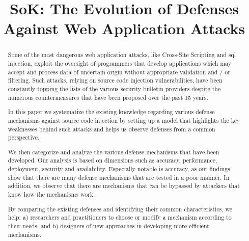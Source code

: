 \documentclass[conference]{IEEEtran}
\date{}
\begin{document}
\author{
}

\title{SoK: The Evolution of Defenses Against Web Application Attacks}

\maketitle
\begin{abstract}

  Some of the most dangerous web application attacks, like Cross-Site
  Scripting and {\sc sql} injection, exploit the oversight of
  programmers that develop applications which may accept and process
  data of uncertain origin without appropriate validation and / or
  filtering. Such attacks, relying on source code injection
  vulnerabilities, have been constantly topping the lists of the
  various security bulletin providers despite the numerous
  countermeasures that have been proposed over the past 15 years.

  In this paper we systematize the existing knowledge regarding
  various defense mechanisms against source code injection by setting
  up a model that highlights the key weaknesses behind such attacks and
  helps us observe defenses from a common perspective.

  We then categorize and analyze the various defense mechanisms that
  have been developed. Our analysis is based on dimensions such as
  accuracy, performance, deployment, security and availability.
  Especially notable is accuracy, as our findings show that there are
  many defense mechanisms that are tested in a poor manner.
  In addition, we observe that there are mechanisms
  that can be bypassed by attackers that know how the mechanisms
  work.

  By comparing the existing defenses and identifying their common
  characteristics, we help: a) researchers and practitioners to choose
  or modify a mechanism according to their needs, and b) designers of
  new approaches in developing more efficient mechanisms.

\end{abstract}
\end{document}
